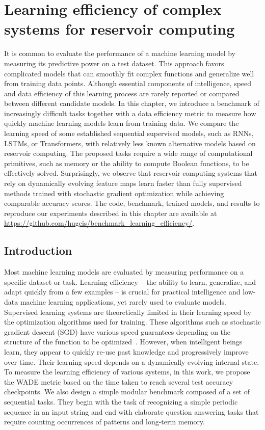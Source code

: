 \chapter{Learning efficiency of complex systems for reservoir computing}
\label{cha:learn-effic-compl}

It is common to evaluate the performance of a machine learning model by
measuring its predictive power on a test dataset. This approach favors
complicated models that can smoothly fit complex functions and generalize well
from training data points. Although essential components of intelligence, speed
and data efficiency of this learning process are rarely reported or compared
between different candidate models. In this chapter, we introduce a benchmark of
increasingly difficult tasks together with a data efficiency metric to measure
how quickly machine learning models learn from training data. We compare the
learning speed of some established sequential supervised models, such as RNNs,
LSTMs, or Transformers, with relatively less known alternative models based on
reservoir computing. The proposed tasks require a wide range of computational
primitives, such as memory or the ability to compute Boolean functions, to be
effectively solved. Surprisingly, we observe that reservoir computing systems
that rely on dynamically evolving feature maps learn faster than fully
supervised methods trained with stochastic gradient optimization while achieving
comparable accuracy scores. The code, benchmark, trained models, and results to
reproduce our experiments described in this chapter are available at
{\small\url{https://github.com/hugcis/benchmark_learning_efficiency/}}.


\section{Introduction}
Most machine learning models are evaluated by measuring performance on a
specific dataset or task. Learning efficiency -- the ability to learn,
generalize, and adapt quickly from a few examples -- is crucial for practical
intelligence \parencite{kanazawaGeneralIntelligenceDomainspecific2004} and
low-data machine learning applications, yet rarely used to evaluate models.
Supervised learning systems are theoretically limited in their learning speed by
the optimization algorithms used for training. These algorithms such as
stochastic gradient descent (SGD) have various speed guarantees depending on the
structure of the function to be
optimized~\parencite{bottouOptimizationMethodsLargescale2018}. However, when
intelligent beings learn, they appear to quickly re-use past knowledge and
progressively improve over time. Their learning speed depends on a dynamically
evolving internal state.
To measure the learning efficiency of various systems, in this work, we propose the \ac{WADE}
metric based on the time taken to reach several test accuracy checkpoints. We
also design a simple modular benchmark composed of a set of sequential tasks.
They begin with the task of recognizing a simple periodic sequence in an input
string and end with elaborate question answering tasks that require counting
occurrences of patterns and long-term memory.

